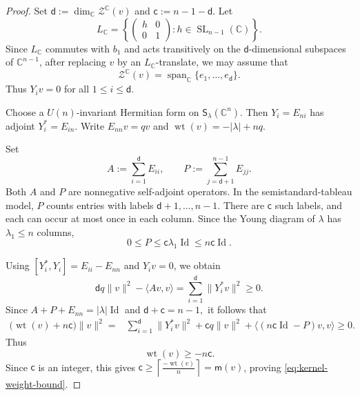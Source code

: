 \documentclass[reqno,11pt]{amsart}
\numberwithin{equation}{section}
\theoremstyle{definition}
\theoremstyle{remark}
\newcommand{\op}{\operatorname}
\newcommand{\SL}{\op{SL}}
\begin{document}
\begin{proof}
Set
$
\mathsf d:=\dim_{\mathbb C}\mathcal Z^{\mathbb C}(v)$
and $\mathsf c:=n-1-\mathsf d.
$
Let
$$
L_{\mathbb C}
=
\left\{
\begin{pmatrix}
h&0\\
0&1
\end{pmatrix}
:h\in\SL_{n-1}(\mathbb C)
\right\}.
$$
Since $L_{\mathbb C}$ commutes with $b_1$ and acts transitively on
the $\mathsf d$-dimensional subspaces of $\mathbb C^{n-1}$, after
replacing $v$ by an $L_{\mathbb C}$-translate, we may assume that
$$
\mathcal Z^{\mathbb C}(v)
=
\operatorname{span}_{\mathbb C}\{e_1,\ldots,e_{\mathsf d}\}.
$$
Thus
$
Y_i v=0$ for all $1\le i\le\mathsf d$.

Choose a $U(n)$-invariant Hermitian form on
$\mathsf S_\lambda(\mathbb C^n)$. Then $Y_i=E_{ni}$ has adjoint
$Y_i^*=E_{in}$. Write
$
E_{nn}v=qv$ and
$\operatorname{wt}(v)=-|\lambda|+nq. $

Set
$$
A:=\sum_{i=1}^{\mathsf d}E_{ii},
\qquad
P:=\sum_{j=\mathsf d+1}^{n-1}E_{jj}.
$$
Both $A$ and $P$ are nonnegative self-adjoint operators. In the
semistandard-tableau model, $P$ counts entries with labels
$\mathsf d+1,\ldots,n-1$. There are $\mathsf c$ such labels, and
each can occur at most once in each column. Since the Young diagram of
$\lambda$ has $\lambda_1\le n$ columns,
$$
0\le P\le\mathsf c\lambda_1\operatorname{Id}
\le n\mathsf c\operatorname{Id}.
$$

Using
$[Y_i^*,Y_i]=E_{ii}-E_{nn}$
and $Y_i v=0$, we obtain
$$
\mathsf d q\|v\|^2-\langle Av,v\rangle
=
\sum_{i=1}^{\mathsf d}\|Y_i^*v\|^2
\ge0.
$$
Since
$A+P+E_{nn}=|\lambda|\operatorname{Id}$ and $
\mathsf d+\mathsf c=n-1,$
it follows that
$$
\begin{aligned}
\bigl(\operatorname{wt}(v)+n\mathsf c\bigr)\|v\|^2
={}&
\sum_{i=1}^{\mathsf d}\|Y_i^*v\|^2
+\mathsf c q\|v\|^2 +
\langle(n\mathsf c\operatorname{Id}-P)v,v\rangle
\ge0.
\end{aligned}
$$
Thus
\begin{equation}\label{eq:auxiliary-weight-bound}
\operatorname{wt}(v)\ge-n\mathsf c.
\end{equation}
Since $\mathsf c$ is an integer, this gives
$\mathsf c
\ge
\left\lceil\frac{-\operatorname{wt}(v)}{n}\right\rceil
= \mathsf m(v)$,
proving \eqref{eq:kernel-weight-bound}.


\end{proof}
\end{document}
